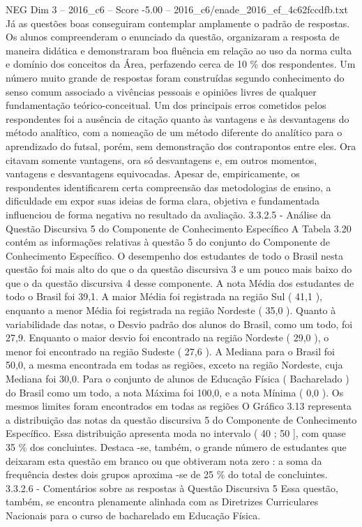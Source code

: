 \begin{textsample}{NEG Dim 3 – 2016\_c6 – Score -5.00 – 2016\_c6/enade\_2016\_ef\_4c62fccdfb.txt}
Já as questões boas conseguiram contemplar amplamente o padrão de respostas.
Os alunos compreenderam o enunciado da questão, organizaram a resposta de maneira didática e demonstraram boa fluência em relação ao uso da norma culta e domínio dos conceitos da Área, perfazendo cerca de 10 \% dos respondentes.
Um número muito grande de respostas foram construídas segundo conhecimento do senso comum associado a vivências pessoais e opiniões livres de qualquer fundamentação teórico-conceitual.
Um dos principais erros cometidos pelos respondentes foi a ausência de citação quanto às vantagens e às desvantagens do método analítico, com a nomeação de um método diferente do analítico para o aprendizado do futsal, porém, sem demonstração dos contrapontos entre eles.
Ora citavam somente vantagens, ora só desvantagens e, em outros momentos, vantagens e desvantagens equivocadas.
Apesar de, empiricamente, os respondentes identificarem certa compreensão das metodologias de ensino, a dificuldade em expor suas ideias de forma clara, objetiva e fundamentada influenciou de forma negativa no resultado da avaliação. 3.3.2.5 - Análise da Questão Discursiva 5 do Componente de Conhecimento Específico A Tabela 3.20 contém as informações relativas à questão 5 do conjunto do Componente de Conhecimento Específico.
O desempenho dos estudantes de todo o Brasil nesta questão foi mais alto do que o da questão discursiva 3 e um pouco mais baixo do que o da questão discursiva 4 desse componente.
A nota Média dos estudantes de todo o Brasil foi 39,1.
A maior Média foi registrada na região Sul ( 41,1 ), enquanto a menor Média foi registrada na região Nordeste ( 35,0 ).
Quanto à variabilidade das notas, o Desvio padrão dos alunos do Brasil, como um todo, foi 27,9.
Enquanto o maior desvio foi encontrado na região Nordeste ( 29,0 ), o menor foi encontrado na região Sudeste ( 27,6 ).
A Mediana para o Brasil foi 50,0, a mesma encontrada em todas as regiões, exceto na região Nordeste, cuja Mediana foi 30,0.
Para o conjunto de alunos de Educação Física ( Bacharelado ) do Brasil como um todo, a nota Máxima foi 100,0, e a nota Mínima ( 0,0 ).
Os mesmos limites foram encontrados em todas as regiões O Gráfico 3.13 representa a distribuição das notas da questão discursiva 5 do Componente de Conhecimento Específico.
Essa distribuição apresenta moda no intervalo ( 40 ; 50 ], com quase 35 \% dos concluintes.
Destaca -se, também, o grande número de estudantes que deixaram esta questão em branco ou que obtiveram nota zero : a soma da frequência destes dois grupos aproxima -se de 25 \% do total de concluintes. 3.3.2.6 - Comentários sobre as respostas à Questão Discursiva 5 Essa questão, também, se encontra plenamente alinhada com as Diretrizes Curriculares Nacionais para o curso de bacharelado em Educação Física.

\end{textsample}
